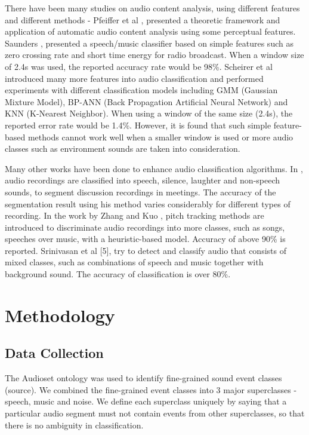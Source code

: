 \documentclass{article}
\begin{document}
There have been many studies on audio content analysis, using different features and different methods \cite{lu2001robust} - Pfeiffer et al \cite{pfeiffer1997automatic}, presented a theoretic framework and application of automatic audio content analysis using some perceptual features. Saunders \cite{saunders1996real}, presented a speech/music classifier based on simple features such as zero crossing rate and short time energy for radio broadcast. When a window size of 2.4s was used, the reported accuracy rate would be 98\%. Scheirer et al \cite{scheirer1997construction} introduced many more features into audio classification and performed experiments with different classification models including GMM (Gaussian Mixture Model), BP-ANN (Back Propagation Artificial Neural Network) and KNN (K-Nearest Neighbor). When using a window of the same size (2.4s), the reported error rate would be 1.4\%. However, it is found that such simple feature-based methods cannot work well when a smaller window is used or more audio classes such as environment sounds are taken into consideration.  

Many other works have been done to enhance audio classification algorithms. In \cite{kimber1997acoustic}, audio recordings are classified into speech, silence, laughter and non-speech sounds, to segment discussion recordings in meetings. The accuracy of the segmentation result using his method varies considerably for different types of recording. In the work by Zhang and Kuo \cite{zhang1999video}, pitch tracking methods are introduced to discriminate audio recordings into more classes, such as songs, speeches over music, with a heuristic-based model. Accuracy of above 90\% is reported. Srinivasan et al [5], try to detect and classify audio that consists of mixed classes, such as combinations of speech and music together with background sound. The accuracy of classification is over 80\%. 

\section{Methodology}
\subsection{Data Collection}
The Audioset \cite{gemmeke2017audio} ontology was used to identify fine-grained sound event classes (source). We combined the fine-grained event classes into 3 major superclasses - speech, music and noise. We define each superclass uniquely by saying that a particular audio segment must not contain events from other superclasses, so that there is no ambiguity in classification. 
\end{document}
